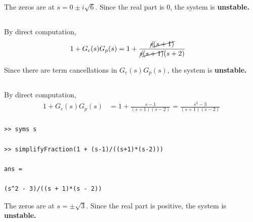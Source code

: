 The zeros are at $s = 0 \pm i\sqrt{6}$. Since the real part is 0, the system is \textbf{unstable.}

\subsection{}
By direct computation,
\begin{align*}
    1 + G_c(s)G_p(s) &= 1 + \frac{\cancel{s}\cancel{(s+1)}}{\cancel{s}\cancel{(s+1)}(s+2)}
\end{align*}

Since there are term cancellations in $G_c(s)G_p(s)$, the system is \textbf{unstable.}

\subsection{}
By direct computation,
\begin{align*}
    1 + G_c(s)G_p(s) &= 1 + \frac{s-1}{(s+1)(s-2)} = \frac{s^2-3}{(s+1)(s-2)} \\
\end{align*}
\begin{verbatim}
>> syms s

>> simplifyFraction(1 + (s-1)/((s+1)*(s-2)))
 
ans =
 
(s^2 - 3)/((s + 1)*(s - 2))
\end{verbatim}

The zeros are at $s = \pm \sqrt{3}$. Since the real part is positive, the system is \textbf{unstable.}